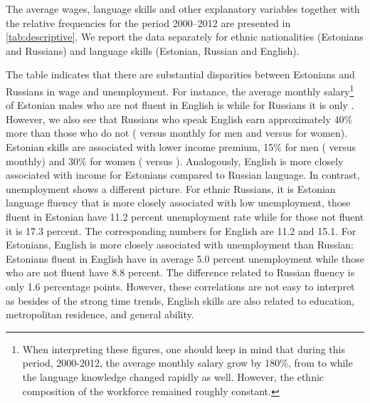 \documentclass[12pt, a4paper]{article}
\begin{document}
The average wages, language skills and other explanatory variables together with the relative frequencies for the period 2000--2012 are presented in \cref{tab:descriptive}. We report the data separately for ethnic nationalities (Estonians and Russians) and language
skills (Estonian, Russian and English).

The table indicates that there are substantial disparities between
Estonians and Russians in wage and unemployment. For instance, the
average monthly salary\footnote{When interpreting these figures,
  one should keep in mind that during this period, 2000-2012, the average monthly salary grow by 180\%,
  from  to  while the language knowledge changed rapidly as
  well.  However, the ethnic composition of the workforce remained
  roughly constant.} of Estonian
males who are not fluent in English is  while for Russians it
is only . However, we also see that Russians who speak
English earn approximately 40\% more than those who do not (
versus  monthly for men and  versus  for
women). Estonian skills are associated with lower income premium, 15\%
for men ( versus  monthly) and 30\% for women
( versus ).  Analogously, English is more closely
associated with income for Estonians compared to Russian language. In
contrast, unemployment shows a different picture. For ethnic Russians,
it is Estonian language fluency that is more closely associated with
low unemployment, those fluent in Estonian have 11.2 percent
unemployment rate while for those not fluent it is 17.3 percent.  The
corresponding numbers for English are 11.2 and 15.1.  For Estonians,
English is more closely associated with unemployment than Russian:
Estonians fluent in English have in average 5.0 percent unemployment
while those who are not fluent have 8.8 percent.  The difference
related to Russian fluency is only 1.6 percentage points.  However,
these correlations are not easy to interpret as besides of the strong
time trends, English skills are
also related to education, metropolitan residence, and general
ability.
\end{document}
